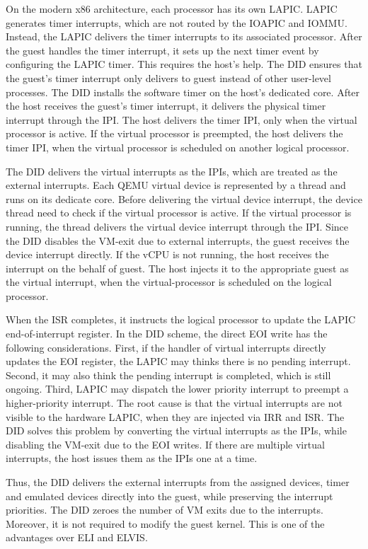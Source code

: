 {On the modern x86 architecture, each processor has its own
LAPIC. LAPIC generates timer interrupts, which are not routed
by the IOAPIC and IOMMU. Instead, the LAPIC delivers the timer
interrupts to its associated processor. After the guest
handles the timer interrupt, it sets up the next timer event
by configuring the LAPIC timer. This requires the host's help.
The DID ensures that the guest's timer interrupt only delivers
to guest instead of other user-level processes. The DID
installs the software timer on the host's dedicated core.
After the host receives the guest's timer interrupt, it
delivers the physical timer interrupt through the IPI. The
host delivers the timer IPI, only when the virtual processor
is active. If the virtual processor is preempted, the host
delivers the timer IPI, when the virtual processor is
scheduled on another logical processor.

The DID delivers the virtual interrupts as the IPIs, which are
treated as the external interrupts. Each QEMU virtual device
is represented by a thread and runs on its dedicate core.
Before delivering the virtual device interrupt, the device
thread need to check if the virtual processor is active. If
the virtual processor is running, the thread delivers the
virtual device interrupt through the IPI. Since the DID
disables the VM-exit due to external interrupts, the guest
receives the device interrupt directly. If the vCPU is not
running, the host receives the interrupt on the behalf of
guest. The host injects it to the appropriate guest as the
virtual interrupt, when the virtual-processor is scheduled on
the logical processor.

When the ISR completes, it instructs the logical processor to
update the LAPIC end-of-interrupt register. In the DID scheme,
the direct EOI write has the following considerations. First,
if the handler of virtual interrupts directly updates the EOI
register, the LAPIC may thinks there is no pending interrupt.
Second, it may also think the pending interrupt is completed,
which is still ongoing. Third, LAPIC may dispatch the lower
priority interrupt to preempt a higher-priority interrupt. The
root cause is that the virtual interrupts are not visible to
the hardware LAPIC, when they are injected via IRR and ISR.
The DID solves this problem by converting the virtual
interrupts as the IPIs, while disabling the VM-exit due to the
EOI writes. If there are multiple virtual interrupts, the host
issues them as the IPIs one at a time.

Thus, the DID delivers the external interrupts from the
assigned devices, timer and emulated devices directly into the
guest, while preserving the interrupt priorities. The DID
zeroes the number of VM exits due to the interrupts. Moreover,
it is not required to modify the guest kernel. This is one of
the advantages over ELI and ELVIS.
}
